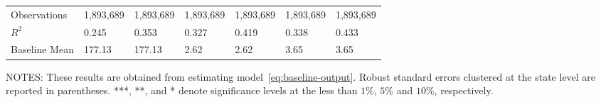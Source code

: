 \begin{table}[H]
{\begin{tabular}{@{}lllllll@{}}
            Observations     & 1,893,689 & 1,893,689 & 1,893,689 & 1,893,689 & 1,893,689 & 1,893,689 \\
            $R^2$            & 0.245     & 0.353     & 0.327     & 0.419     & 0.338     & 0.433     \\
            Baseline Mean    & 177.13    & 177.13    & 2.62      & 2.62      & 3.65      & 3.65      \\ \bottomrule\bottomrule
        \end{tabular}%
    }
    \begin{minipage}{\columnwidth}
        \vspace{0.05in}
        \tiny NOTES: These results are obtained from estimating model~\ref{eq:baseline-output}. Robust standard errors clustered at the state level are reported in parentheses. ***, **, and * denote significance levels at the less than $1\%$, $5\%$ and $10\%$, respectively.
    \end{minipage}
\end{table}
